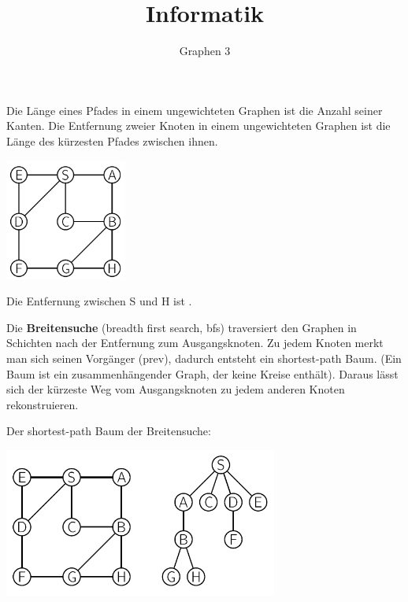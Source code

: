 \usepackage[ngerman]{babel}
\usepackage[utf8]{inputenc}
\usepackage{amsmath}
\usepackage{amssymb}
\usepackage{listings} 
\usepackage{stmaryrd}
\lstset{language=Python, tabsize=4, showstringspaces=false,basicstyle=\footnotesize,mathescape=true} 
\usepackage{mathtools}
\usepackage{ulem}
\usepackage{tikz}

\parskip 10pt




\title{Informatik}   
\author{Graphen 3} 
\date{}
\frame{\titlepage} 

\begin{frame}[fragile]

Die Länge eines Pfades in einem ungewichteten Graphen ist die Anzahl seiner Kanten. Die Entfernung zweier Knoten 
in einem ungewichteten Graphen ist die Länge des kürzesten Pfades zwischen ihnen.

\includegraphics[height=4cm]{bild41.png}

Die Entfernung zwischen S und H ist .
\end{frame}

\begin{frame}[fragile]

Die \textbf{Breitensuche} (breadth first search, bfs) traversiert den Graphen in Schichten nach der Entfernung zum Ausgangsknoten.
Zu jedem Knoten merkt man sich seinen Vorgänger (prev), dadurch entsteht ein shortest-path Baum.
(Ein Baum ist ein zusammenhängender Graph, der keine Kreise enthält). Daraus lässt sich der kürzeste
Weg vom Ausgangsknoten zu jedem anderen Knoten rekonstruieren.



\end{frame}

\begin{frame}[fragile]
Der shortest-path Baum der Breitensuche:

\includegraphics[width=9cm]{bild42.png}

\end{frame}

